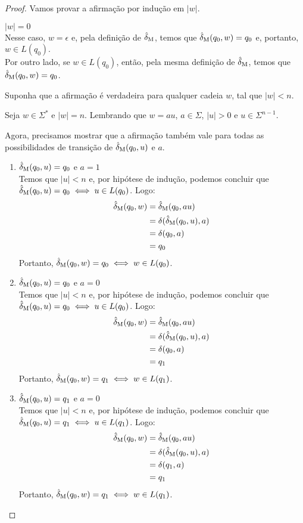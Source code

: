 \begin{proof} Vamos provar a afirmação por indução em $|w|$.

\indbase $|w| = 0$\\[3pt]
Nesse caso, $w = \epsilon$ e, pela definição de $\operatorname{\hat{\delta}_M}$, temos que $\operatorname{\hat{\delta}_M}(q_0, w) = q_0$ e, portanto, $w \in L(q_0)$.\\
Por outro lado, se $w \in L(q_0)$, então, pela mesma definição de $\operatorname{\hat{\delta}_M}$, temos que $\operatorname{\hat{\delta}_M}(q_0, w) = q_0$.

\indhypo Suponha que a afirmação é verdadeira para qualquer cadeia $w$, tal que $|w| < n$.

\indstep Seja $w \in \Sigma^*$ e $|w| = n$. Lembrando que $w = au$, $a \in \Sigma$, $|u| > 0$ e $u \in \Sigma^{n - 1}$.

Agora, precisamos mostrar que a afirmação também vale para todas as possibilidades de transição de $\operatorname{\hat{\delta}_M}(q_0, u)$ e $a$.

\begin{enumerate}[label=\textbf{(\arabic*)}]
\item $\operatorname{\hat{\delta}_M}(q_0, u) = q_0$ e $a = 1$\\
Temos que $|u| < n$ e, por hipótese de indução, podemos concluir que $\operatorname{\hat{\delta}_M}(q_0, u) = q_0 \iff u \in L(q_0)$. Logo:
\begin{align*}
    \operatorname{\hat{\delta}_M}(q_0, w) &= \operatorname{\hat{\delta}_M}(q_0, au)\\
                    &= \delta(\operatorname{\hat{\delta}_M}(q_0, u), a)\\
                    &= \delta(q_0, a)\\
                    &= q_0
\end{align*}
Portanto, $\operatorname{\hat{\delta}_M}(q_0, w) = q_0 \iff w \in L(q_0)$.

\item $\operatorname{\hat{\delta}_M}(q_0, u) = q_0$ e $a = 0$\\
Temos que $|u| < n$ e, por hipótese de indução, podemos concluir que $\operatorname{\hat{\delta}_M}(q_0, u) = q_0 \iff u \in L(q_0)$. Logo:
\begin{align*}
    \operatorname{\hat{\delta}_M}(q_0, w) &= \operatorname{\hat{\delta}_M}(q_0, au)\\
                    &= \delta(\operatorname{\hat{\delta}_M}(q_0, u), a)\\
                    &= \delta(q_0, a)\\
                    &= q_1
\end{align*}
Portanto, $\operatorname{\hat{\delta}_M}(q_0, w) = q_1 \iff w \in L(q_1)$.

\item $\operatorname{\hat{\delta}_M}(q_0, u) = q_1$ e $a = 0$\\
Temos que $|u| < n$ e, por hipótese de indução, podemos concluir que $\operatorname{\hat{\delta}_M}(q_0, u) = q_1 \iff u \in L(q_1)$. Logo:
\begin{align*}
    \operatorname{\hat{\delta}_M}(q_0, w) &= \operatorname{\hat{\delta}_M}(q_0, au)\\
                    &= \delta(\operatorname{\hat{\delta}_M}(q_0, u), a)\\
                    &= \delta(q_1, a)\\
                    &= q_1
\end{align*}
Portanto, $\operatorname{\hat{\delta}_M}(q_0, w) = q_1 \iff w \in L(q_1)$.


\end{enumerate}
\end{proof}
